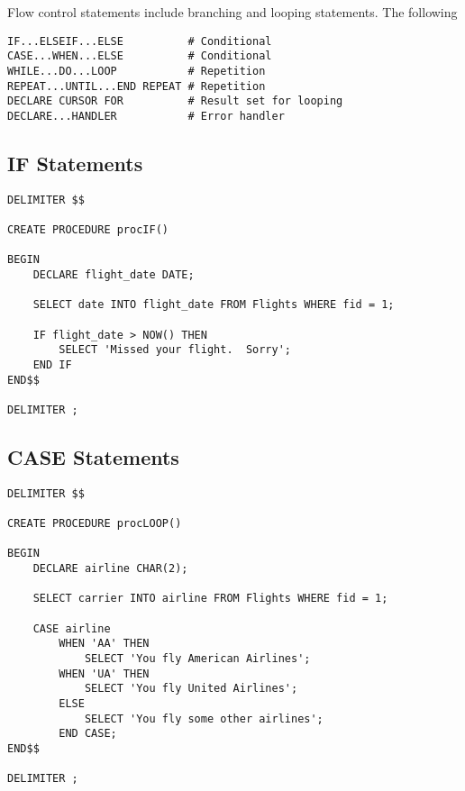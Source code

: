 \documentclass{article}
\begin{document}
Flow control statements include branching and looping statements.  The following 
  
 
  
\begin{lstlisting}[frame=single]  
IF...ELSEIF...ELSE			# Conditional
CASE...WHEN...ELSE			# Conditional
WHILE...DO...LOOP			# Repetition
REPEAT...UNTIL...END REPEAT	# Repetition
DECLARE CURSOR FOR			# Result set for looping
DECLARE...HANDLER			# Error handler
\end{lstlisting} 




  
  
  
\subsection*{IF Statements}
  
 \begin{lstlisting}[frame=single]  
DELIMITER $$

CREATE PROCEDURE procIF()

BEGIN
	DECLARE flight_date DATE;
	
	SELECT date INTO flight_date FROM Flights WHERE fid = 1;
	
	IF flight_date > NOW() THEN
		SELECT 'Missed your flight.  Sorry';
	END IF
END$$

DELIMITER ;
\end{lstlisting} 




  
  
\subsection*{CASE Statements}
  
\begin{lstlisting}[frame=single]  
DELIMITER $$

CREATE PROCEDURE procLOOP()

BEGIN
	DECLARE airline CHAR(2);
	
	SELECT carrier INTO airline FROM Flights WHERE fid = 1;
	
	CASE airline
		WHEN 'AA' THEN 
			SELECT 'You fly American Airlines';
		WHEN 'UA' THEN
			SELECT 'You fly United Airlines';
		ELSE
			SELECT 'You fly some other airlines';
		END CASE;
END$$

DELIMITER ;
\end{lstlisting} 
\end{document}
